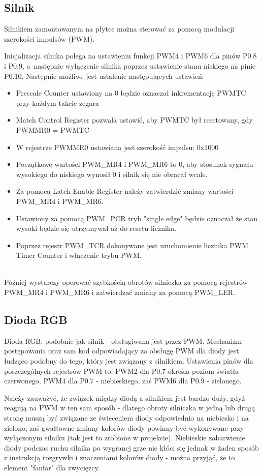 \documentclass[a4paper, portrait,11pt]{article}
\begin{document}
\subsection{Silnik}
Silnikiem zamontowanym na płytce można sterować za pomocą
modulacji szerokości impulsów (PWM).

Inicjalizacja silnika polega na ustawieniu funkcji PWM4
i PWM6 dla pinów P0.8 i P0.9, a~następnie wyłączenie
silnika poprzez ustawienie stanu niskiego na pinie P0.10.
Następnie możliwe jest ustalenie następujących ustawień:

\begin{itemize}
\item Prescale Counter ustawiony na 0 będzie oznaczał inkrementację PWMTC przy każdym takcie zegara
\item Match Control Register pozwala ustawić, aby PWMTC był resetowany, gdy PWMMR0 = PWMTC
\item W rejestrze PWMMR0 ustawiana jest szerokość impulsu: 0x1000
\item Początkowe wartości PWM\_MR4 i PWM\_MR6 to 0, aby stosunek sygnału wysokiego do niskiego wynosił 0 i silnik się nie obracał wcale.
\item Za pomocą Latch Enable Register należy zatwierdzić zmiany wartości PWM\_MR4 i PWM\_MR6.
\item Ustawiony za pomocą PWM\_PCR tryb "single edge" będzie oznaczał że stan wysoki będzie się utrzymywał aż do resetu licznika.
\item Poprzez rejestr PWM\_TCR dokonywane jest uruchomienie licznika PWM Timer Counter i włączenie trybu PWM.
\end{itemize}\ \\

Później wystarczy operować szybkością obrotów silniczka za pomocą rejestrów PWM\_MR4 i PWM\_MR6 i zatwierdzać zmiany
za pomocą PWM\_LER.

\subsection{Dioda RGB}
Dioda RGB, podobnie jak silnik - obsługiwana jest przez PWM. Mechanizm postępowania oraz sam
kod odpowiadający za obsługę PWM dla diody jest łudząco podobny do tego, który jest związany
z silnikiem. Ustawienia pinów dla poszczególnych rejestrów PWM to:
PWM2 dla P0.7 określa poziom światła czerwonego, PWM4 dla P0.7 - niebieskiego, zaś PWM6 dla P0.9
- zielonego.

Należy zauważyć, że związek między diodą a silnikiem jest bardzo duży, gdyż reagują na PWM
w ten sam sposób - dlatego obroty silniczka w jedną lub drugą stronę muszą być związane
ze świeceniem diody odpowiednio na niebiesko i na zielono, zaś gwałtowne zmiany kolorów
diody powinny być wykonywane przy wyłączonym silniku (tak jest to zrobione w projekcie).
Niebieskie zabarwienie diody podczas ruchu silnika po wygranej grze nie kłóci się
jednak w żaden sposób z instrukcją rozgrywki i znaczeniami kolorów diody - można
przyjąć, że to element "fanfar" dla zwycięzcy.
\end{document}
